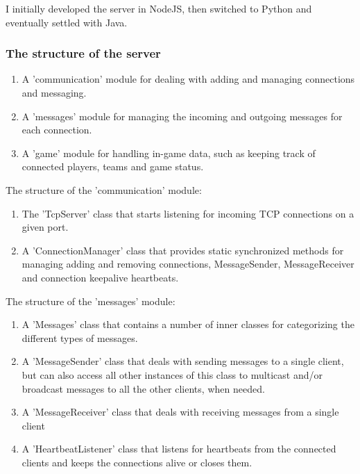 \documentclass{article}
\begin{document}
I initially developed the server in NodeJS, then switched to Python and
eventually settled with Java.\newline

\subsubsection{The structure of the server}
 
\begin{enumerate}
  
  \item A 'communication' module for dealing with adding and managing
  connections and messaging.
  
  \item A 'messages' module for managing the incoming and outgoing messages for
  each connection.
  
  \item A 'game' module for handling in-game data, such as keeping track of
  connected players, teams and game status. 
  
\end{enumerate}

The structure of the 'communication' module:

\begin{enumerate}
  
  \item The 'TcpServer' class that starts listening for incoming TCP connections
  on a given port. 
	
  \item A 'ConnectionManager' class that provides static synchronized methods
  for managing adding and removing connections, MessageSender, MessageReceiver
  and connection keepalive heartbeats.
  
\end{enumerate}

The structure of the 'messages' module:

\begin{enumerate}
  
  \item A 'Messages' class that contains a number of inner classes for
  categorizing the different types of messages.
  
  \item A 'MessageSender' class that deals with sending messages to a single
  client, but can also access all other instances of this class to multicast
  and/or broadcast messages to all the other clients, when needed.
  
  \item A 'MessageReceiver' class that deals with receiving messages from a
  single client
  
  \item A 'HeartbeatListener' class that listens for heartbeats from the
  connected clients and keeps the connections alive or closes them.
  
\end{enumerate}
\end{document}
